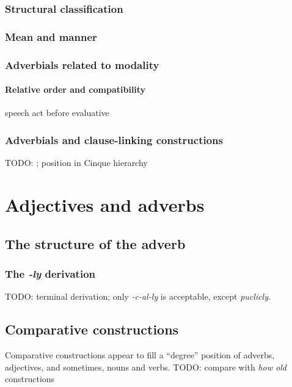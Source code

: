 \documentclass[UTF8, a4paper, oneside, scheme=plain, 12pt]{ctexbook}
\newcommand*{\citesec}[1]{\S~{#1}}
\newcommand*{\citechap}[1]{Ch.~{#1}}
\newcommand*{\citepage}[1]{p.~{#1}}
\newcommand{\form}[1]{\emph{#1}}
\begin{document}
\subsection{Structural classification}

\subsection{Mean and manner}

\subsection{Adverbials related to modality}


\subsubsection{Relative order and compatibility}

speech act before evaluative \citep[\citepage{106}]{cinque1999adverbs}

\subsection{Adverbials and clause-linking constructions}

TODO: \citet[\citechap{8}, \citesec{12}]{cgel}; position in Cinque hierarchy

\chapter{Adjectives and adverbs}

\section{The structure of the adverb}

\subsection{The \form{-ly} derivation}

TODO: terminal derivation; only \form{-c-al-ly} is acceptable,
except \form{puclicly}.

\section{Comparative constructions}

Comparative constructions appear to fill a ``degree'' position
of adverbs, adjectives, and sometimes, nouns and verbs.
TODO: compare with \form{how old} constructions  
\end{document}
